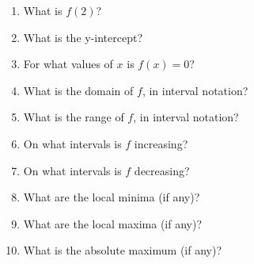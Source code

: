\documentclass[letterpaper,12pt,fleqn]{article}
\begin{document}
\begin{enumerate}
\item What is $f(2)$?

  \vspace{0.5in}

\item What is the y-intercept?

  \vspace{0.5in}

\item For what values of $x$ is $f(x)=0$?

  \newpage

\item What is the domain of $f$, in interval notation?

  \vspace{0.5in}

\item What is the range of $f$, in interval notation?
  
  \vspace{0.5in}

\item On what intervals is $f$ increasing?

  \vspace{0.5in}

\item On what intervals is $f$ decreasing?

  \vspace{0.5in}

\item What are the local minima (if any)?

  \vspace{0.5in}

\item What are the local maxima (if any)?

  \vspace{0.5in}

\item What is the absolute maximum (if any)?
  
\end{enumerate}
\end{document}
